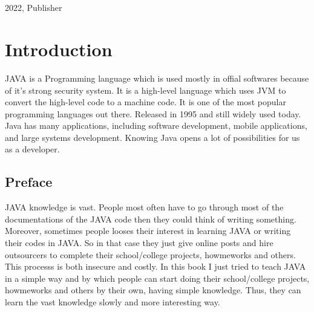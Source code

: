 \documentclass[A4 paper,openany]{book}  %
\begin{document}
\begin{titlepage}
{\begin{verbatim}
                                                                                                      
                                                                                                      
        \end{verbatim}
    }
    \vfill
    {\small{2022, Publisher}}
\end{titlepage}


\pagecolor{smokeWhite}
\color{black}
\newpage
\tableofcontents
\newpage
\listoffigures
\newpage
\listoftables
\newpage

% 
% 
\part{Introduction}
JAVA\cite{Ref1} is a Programming language which is used mostly in offial softwares because of it's strong security system.
It is a high-level language which uses JVM to convert the high-level code to a machine code.
It is one of the most popular programming languages out there. Released in 1995 and still widely used today.
Java has many applications, including software development, mobile applications, and large systems development.
Knowing Java opens a lot of possibilities for us as a developer.

\chapter*{Preface}
JAVA\cite{Ref1} knowledge is vast. People most often have to go through most of the documentations of the JAVA code then they could think of writing something.
Moreover, sometimes people looses their interest in learning JAVA or writing their codes in JAVA. So in that case they just give online posts
and hire outsourcers to complete their school/college projects, howmeworks and others.
This processs is both insecure and costly. In this book I just tried to teach JAVA in a simple way and by which
people can start doing their school/college projects, howmeworks and others by their own, having simple knowledge. Thus, they can learn the vast knowledge slowly and more interesting way.

% 
% 
\end{document}
